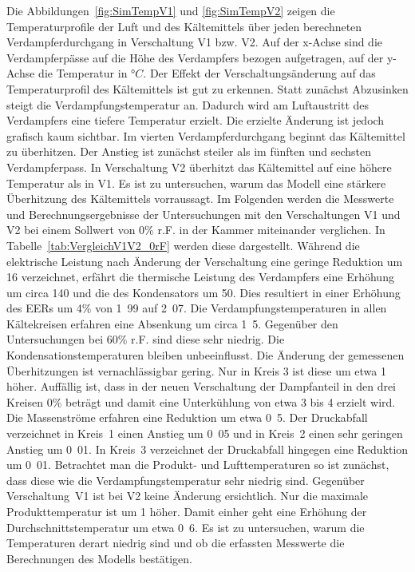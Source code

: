 Die Abbildungen~\ref{fig:SimTempV1} und \ref{fig:SimTempV2} zeigen die Temperaturprofile der Luft und des Kältemittels über jeden berechneten Verdampferdurchgang in Verschaltung V1 bzw. V2. Auf der x-Achse sind die Verdampferpässe auf die Höhe des Verdampfers bezogen aufgetragen, auf der y-Achse die Temperatur in °$C$. Der Effekt der Verschaltungsänderung auf das Temperaturprofil des Kältemittels ist gut zu erkennen. Statt zunächst Abzusinken steigt die Verdampfungstemperatur an. Dadurch wird am Luftaustritt des Verdampfers eine tiefere Temperatur erzielt. Die erzielte Änderung ist jedoch grafisch kaum sichtbar. Im vierten Verdampferdurchgang beginnt das Kältemittel zu überhitzen. Der Anstieg ist zunächst steiler als im fünften und sechsten Verdampferpass. In Verschaltung V2 überhitzt das Kältemittel auf eine höhere Temperatur als in V1. Es ist zu untersuchen, warum das Modell eine stärkere Überhitzung des Kältemittels vorraussagt. \newline
Im Folgenden werden die Messwerte und Berechnungsergebnisse der Untersuchungen mit den Verschaltungen V1 und V2 bei einem Sollwert von \unit{0}{\%} r.F. in der Kammer miteinander verglichen. In Tabelle~\ref{tab:VergleichV1V2_0rF} werden diese dargestellt. Während die elektrische Leistung nach Änderung der Verschaltung eine geringe Reduktion um \unit{16}{\watt} verzeichnet, erfährt die thermische Leistung des Verdampfers eine Erhöhung um circa \unit{140}{\watt} und die des Kondensators um \unit{50}{\watt}. Dies resultiert in einer Erhöhung des EERs um \unit{4}{\%} von \unit{1.99}{} auf \unit{2.07}{}.
Die Verdampfungstemperaturen in allen Kältekreisen erfahren eine Absenkung um circa \unit{1.5}{\kelvin}. Gegenüber den Untersuchungen bei \unit{60}{\%} r.F. sind diese sehr niedrig. Die Kondensationstemperaturen bleiben unbeeinflusst. Die Änderung der gemessenen Überhitzungen ist vernachlässigbar gering. Nur in Kreis 3 ist diese um etwa \unit{1}{\kelvin} höher. Auffällig ist, dass in der neuen Verschaltung der Dampfanteil in den drei Kreisen \unit{0}{\%} beträgt und damit eine Unterkühlung von etwa \unit{3}{\kelvin} bis \unit{4}{\kelvin} erzielt wird. Die Massenströme erfahren eine Reduktion um etwa \unit{0.5}{\gram\per\second}. Der Druckabfall verzeichnet in Kreis~1 einen Anstieg um \unit{0.05}{\bbar} und in Kreis~2 einen sehr geringen Anstieg um \unit{0.01}{\bbar}. In Kreis~3 verzeichnet der Druckabfall hingegen eine Reduktion um \unit{0.01}{\bbar}. Betrachtet man die Produkt- und Lufttemperaturen so ist zunächst, dass diese wie die Verdampfungstemperatur sehr niedrig sind. Gegenüber Verschaltung~V1 ist bei V2 keine Änderung ersichtlich. Nur die maximale Produkttemperatur ist um \unit{1}{\kelvin} höher. Damit einher geht eine Erhöhung der Durchschnittstemperatur um etwa \unit{0.6}{\kelvin}. Es ist zu untersuchen, warum die Temperaturen derart niedrig sind und ob die erfassten Messwerte die Berechnungen des Modells bestätigen.

